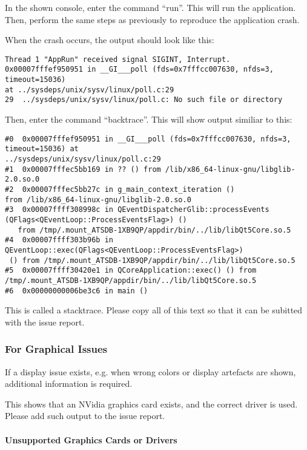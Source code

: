 In the shown console, enter the command ``run''. This will run the application. Then, perform the same steps as previously to reproduce the application crash.

When the crash occurs, the output should look like this:

\begin{verbatim}
Thread 1 "AppRun" received signal SIGINT, Interrupt.
0x00007fffef950951 in __GI___poll (fds=0x7fffcc007630, nfds=3, timeout=15036) 
at ../sysdeps/unix/sysv/linux/poll.c:29
29	../sysdeps/unix/sysv/linux/poll.c: No such file or directory
\end{verbatim}

Then, enter the command ``backtrace''. This will show output similiar to this:

\begin{verbatim}
#0  0x00007fffef950951 in __GI___poll (fds=0x7fffcc007630, nfds=3, timeout=15036) at 
../sysdeps/unix/sysv/linux/poll.c:29
#1  0x00007fffec5bb169 in ?? () from /lib/x86_64-linux-gnu/libglib-2.0.so.0
#2  0x00007fffec5bb27c in g_main_context_iteration () 
from /lib/x86_64-linux-gnu/libglib-2.0.so.0
#3  0x00007ffff308998c in QEventDispatcherGlib::processEvents
(QFlags<QEventLoop::ProcessEventsFlag>) ()
   from /tmp/.mount_ATSDB-1XB9QP/appdir/bin/../lib/libQt5Core.so.5
#4  0x00007ffff303b96b in QEventLoop::exec(QFlags<QEventLoop::ProcessEventsFlag>)
 () from /tmp/.mount_ATSDB-1XB9QP/appdir/bin/../lib/libQt5Core.so.5
#5  0x00007ffff30420e1 in QCoreApplication::exec() () from 
/tmp/.mount_ATSDB-1XB9QP/appdir/bin/../lib/libQt5Core.so.5
#6  0x00000000006be3c6 in main ()
\end{verbatim}

This is called a stacktrace. Please copy all of this text so that it can be subitted with the issue report.

\subsubsection{For Graphical Issues}

If a display issue exists, e.g. when wrong colors or display artefacts are shown, additional information is required.



This shows that an NVidia graphics card exists, and the correct driver is used. Please add such output to the issue report.

\paragraph{Unsupported Graphics Cards or Drivers}

